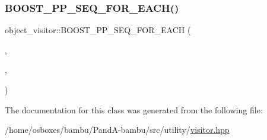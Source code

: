 \subsubsection{\texorpdfstring{B\+O\+O\+S\+T\+\_\+\+P\+P\+\_\+\+S\+E\+Q\+\_\+\+F\+O\+R\+\_\+\+E\+A\+C\+H()}{BOOST\_PP\_SEQ\_FOR\_EACH()}\hspace{0.1cm}{\footnotesize\ttfamily [2/2]}}
{\footnotesize\ttfamily object\+\_\+visitor\+::\+B\+O\+O\+S\+T\+\_\+\+P\+P\+\_\+\+S\+E\+Q\+\_\+\+F\+O\+R\+\_\+\+E\+A\+CH (\begin{DoxyParamCaption}\item[{\hyperlink{visitor_8hpp_a824d794626a77855112081a5d90bd4bd}{O\+P\+E\+R\+A\+T\+O\+R\+\_\+\+M\+A\+C\+RO}}]{,  }\item[{B\+O\+O\+S\+T\+\_\+\+P\+P\+\_\+\+E\+M\+P\+TY}]{,  }\item[{\hyperlink{tree__node_8hpp_aba1e488d3cf28336c0003e537659cba0}{V\+I\+S\+I\+T\+E\+D\+\_\+\+O\+B\+J\+\_\+\+S\+E\+Q2}}]{ }\end{DoxyParamCaption})}



The documentation for this class was generated from the following file\+:\begin{DoxyCompactItemize}
\item 
/home/osboxes/bambu/\+Pand\+A-\/bambu/src/utility/\hyperlink{visitor_8hpp}{visitor.\+hpp}\end{DoxyCompactItemize}
